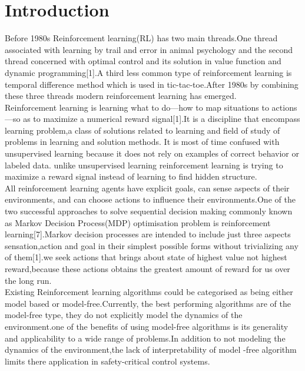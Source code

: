 \chapter{Introduction}

 Before 1980s Reinforcement learning(RL) has two main threads.One thread associated with learning by trail and error in animal psychology and the second thread concerned with  optimal control and its solution in value function and dynamic programming[1].A third  less common type of reinforcement learning is temporal difference method which is used in tic-tac-toe.After 1980s by combining these three threads modern reinforcement learning has emerged.\\
 
Reinforcement learning is learning what to do—how to map situations to actions—so as to maximize a numerical reward signal[1].It is a discipline that encompass learning problem,a class of solutions related to learning and field of study of problems in learning and solution methods. It is most of time confused with unsupervised learning because it does not rely on examples of correct behavior or labeled data. unlike unsupervised learning  reinforcement learning is trying to maximize a reward signal instead of learning to find hidden structure.\\

All reinforcement learning agents have explicit goals, can sense aspects of their environments, and can choose actions to influence their environments.One of the two successful approaches to solve sequential decision making commonly known as  Markov Decision Process(MDP) optimisation problem is reinforcement learning[7].Markov decision processes are intended to include just three aspects  sensation,action and goal  in their simplest possible forms without trivializing any of them[1].we seek actions that brings about state of highest value not highest reward,because these actions obtains the greatest amount of reward for us over the long run.\\


Existing Reinforcement learning algorithms could be categorised as being either model based or model-free.Currently, the best performing algorithms are of the model-free type, they do not explicitly model the dynamics of the environment.one of the benefits of using model-free algorithms is its generality and applicability to a wide range of problems.In addition to not modeling the dynamics of the environment,the lack of interpretability of model -free  algorithm limits there application in safety-critical control systems.\\

